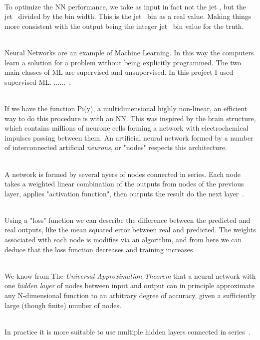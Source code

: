 \ \\To optimize the NN performance, we take as input in fact not the jet \pt, but the jet \pt~divided by the bin width. This is the jet \pt~bin as a real value. Making things more consistent with the output being the integer jet \pt~bin value for the truth.

\ \\ Neural Networks are an example of Machine Learning. In this way the computers learn a solution for a problem without being explicitly programmed. The two main classes of ML are supervised and unsupervised. 
In this project I used supervised ML. ......~\cite{AndrewNg}.

\ \\If we have the function Pi(y), a multidimensional highly non-linear, an efficient way to do this procedure is with an NN. This was inspired by the brain structure, which contains millions of neurone cells forming a network with electrochemical impulses passing between them. An artificial neural network formed by a number of interconnected artificial \emph{neurons}, or "nodes" respects this architecture. 

\ \\A network is formed by several ayers of nodes connected in series. Each node takes a weighted linear combination of the outputs from nodes of the previous layer, applies "activation function", then outputs the result do the next layer~\cite{AndrewNg}.

\ \\Using a "loss" function we can describe the difference between the predicted and real outputs, like the mean squared error between real and predicted. The weights associated with each node is modifies via an algorithm, and from here we can deduce that the loss function decreases and training increases.

\ \\We know from The \emph{Universal Approximation Theorem} that a neural network with one \emph{hidden layer} of nodes between input and output can in principle approximate any N-dimensional function to an arbitrary degree of accuracy, given a sufficiently large (though finite) number of nodes. 

\ \\In practice it is more suitable to use multiple hidden layers connected in series~\cite{AndrewNg}.
